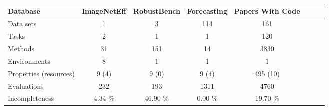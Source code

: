 
    \begin{tabular}{lccccccc}
        \toprule 
        Database & ImageNetEff & RobustBench & Forecasting & Papers With Code \\
        \midrule
        Data sets & 1 & 3 & 114 & 161 \\
        Tasks & 2 & 1 & 1 & 120 \\
        Methods & 31 & 151 & 14 & 3830 \\
        Environments & 8 & 1 & 1 & 1 \\
        Properties (resources) & 9 (4) & 9 (0) & 9 (4) & 495 (10) \\
        Evaluations & 232 & 193 & 1311 & 4760 \\
        Incompleteness &  4.34 \% & 46.90 \% &  0.00 \% & 19.70 \% \\
        \bottomrule
    \end{tabular}